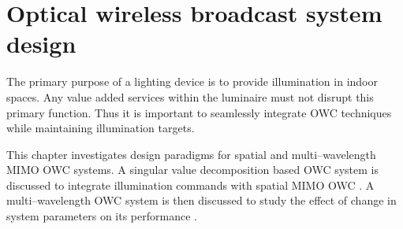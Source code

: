 \chapter{Optical wireless broadcast system design}
\label{chapter:system}
\thispagestyle{myheadings}

The primary purpose of a lighting device is to provide illumination in indoor spaces. Any value added services within the luminaire must not disrupt this primary function. Thus it is important to seamlessly integrate OWC techniques while maintaining illumination targets.

This chapter investigates design paradigms for spatial and multi--wavelength MIMO OWC systems. A singular value decomposition based OWC system is discussed to integrate illumination commands with spatial MIMO OWC \cite{but13a}. A multi--wavelength OWC system is then discussed to study the effect of change in system parameters on its performance \cite{but14c}.



